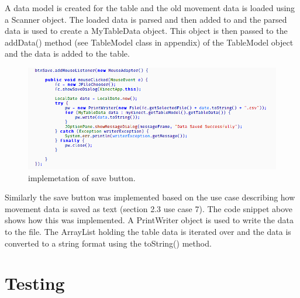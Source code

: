 \documentclass[a4paper, 12pt]{article}
\begin{document}
A data model is created for the table and the old movement data is loaded using a Scanner object. The loaded data is parsed and then added to and the parsed data is used to create a MyTableData object. This object is then passed to the addData() method (see TableModel class in appendix) of the TableModel object  and the data is added to the table.

 \begin{figure}[!htb]
	\begin{center}
  \includegraphics[scale=0.75]{codesnippet17.png}
  	\caption{implemetation of save button.}
  \end{center} 
  \label{fig: codesnippet16} 
\end{figure}

Similarly the save button was implemented based on the use case describing how movement data is saved as text (section 2.3 use case 7). The code snippet above shows how this was implemented. A PrintWriter object is used to write the data to the file. The ArrayList holding the table data is iterated over and the data is converted to a string format using the toString() method. 

\section{Testing}




\clearpage
\newpage



 
\end{document}

